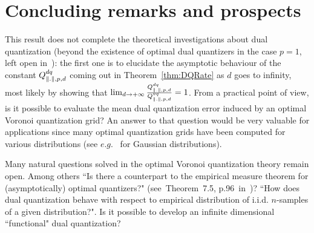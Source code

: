 \documentclass[a4paper]{article}
\theoremstyle{plain}%
\theoremstyle{remark}
\begin{document}
\maketitle











\medskip
\section{Concluding  remarks and prospects} This result does not complete the theoretical investigations about dual quantization (beyond the existence of optimal dual quantizers in the case $p=1$, left open in~\cite{dualStat}): the first one is to elucidate the asymptotic behaviour of the constant $Q^{dq}_{\lVert.\rVert,p,d}$ coming out in Theorem~\ref{thm:DQRate} as $d$ goes to infinity,  most likely by showing that  $\lim_{d\to +\infty} \frac{Q^{dq}_{\lVert.\rVert,p,d}}{Q^{vq}_{\lVert.\rVert,p,d}}=1$. From a practical point of view, is it possible to evaluate the mean dual quantization error induced by an optimal Voronoi quantization grid? An answer to that question would be very valuable for applications since many optimal quantization grids have been computed for various distributions (see $e.g.$~\cite{Website} for Gaussian distributions).

Many natural questions  solved  in the optimal Voronoi quantization theory remain open. Among others  ``Is there  a counterpart to the empirical measure theorem for (asymptotically) optimal quantizers?" (see~Theorem~7.5, p.96~in~\cite{Foundations})? ``How does dual  quantization  behave with respect to empirical distribution of i.i.d. $n$-samples of a given distribution?".  Is it possible to develop an infinite dimensional ``functional" dual quantization?
%


\appendix


\small

\end{document}
